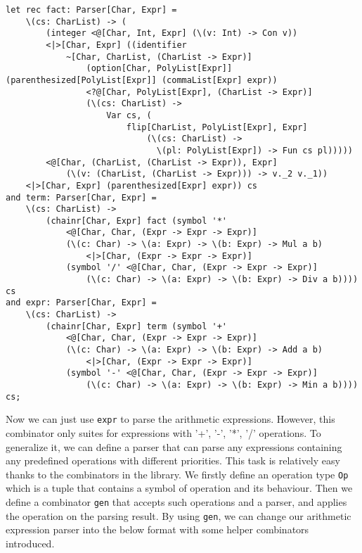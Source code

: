 \begin{lstlisting}
let rec fact: Parser[Char, Expr] =
    \(cs: CharList) -> (
        (integer <@[Char, Int, Expr] (\(v: Int) -> Con v))
        <|>[Char, Expr] ((identifier
            ~[Char, CharList, (CharList -> Expr)]
                (option[Char, PolyList[Expr]] (parenthesized[PolyList[Expr]] (commaList[Expr] expr))
                <?@[Char, PolyList[Expr], (CharList -> Expr)]
                (\(cs: CharList) ->
                    Var cs, (
                        flip[CharList, PolyList[Expr], Expr]
                            (\(cs: CharList) ->
                              \(pl: PolyList[Expr]) -> Fun cs pl)))))
        <@[Char, (CharList, (CharList -> Expr)), Expr]
            (\(v: (CharList, (CharList -> Expr))) -> v._2 v._1))
    <|>[Char, Expr] (parenthesized[Expr] expr)) cs
and term: Parser[Char, Expr] =
    \(cs: CharList) ->
        (chainr[Char, Expr] fact (symbol '*'
            <@[Char, Char, (Expr -> Expr -> Expr)]
            (\(c: Char) -> \(a: Expr) -> \(b: Expr) -> Mul a b)
                <|>[Char, (Expr -> Expr -> Expr)]
            (symbol '/' <@[Char, Char, (Expr -> Expr -> Expr)]
                (\(c: Char) -> \(a: Expr) -> \(b: Expr) -> Div a b)))) cs
and expr: Parser[Char, Expr] =
    \(cs: CharList) ->
        (chainr[Char, Expr] term (symbol '+'
            <@[Char, Char, (Expr -> Expr -> Expr)]
            (\(c: Char) -> \(a: Expr) -> \(b: Expr) -> Add a b)
                <|>[Char, (Expr -> Expr -> Expr)]
            (symbol '-' <@[Char, Char, (Expr -> Expr -> Expr)]
                (\(c: Char) -> \(a: Expr) -> \(b: Expr) -> Min a b)))) cs;
\end{lstlisting}
Now we can just use \texttt{expr} to parse the arithmetic expressions. However, this combinator only suites for expressions with '+', '-', '*', '/' operations. To generalize it, we can define a parser that can parse any expressions containing any predefined operations with different priorities. This task is relatively easy thanks to the combinators in the library. We firstly define an operation type \texttt{Op} which is a tuple that contains a symbol of operation and its behaviour. Then we define a combinator \texttt{gen} that accepts such operations and a parser, and applies the operation on the parsing result. By using \texttt{gen}, we can change our arithmetic expression parser into the below format with some helper combinators introduced.
